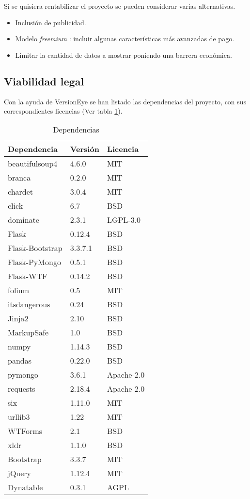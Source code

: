 Si se quisiera rentabilizar el proyecto se pueden considerar varias alternativas.

\begin{itemize}
	\item Inclusión de publicidad.
	\item Modelo \textit{freemium} \cite{wiki:freemium}: incluir algunas características más avanzadas de pago.
	\item Limitar la cantidad de datos a mostrar poniendo una barrera económica.
\end{itemize}

\subsection{Viabilidad legal}

Con la ayuda de VersionEye \cite{misc:versioneye} se han listado las dependencias del proyecto, con sus correspondientes licencias (Ver tabla \ref{tab:dependencias}). 

\begin{table}[]
	\centering
	\begin{tabular}{lll}
		\hline
		Dependencia & Versión & Licencia \\ \hline
		beautifulsoup4 & 4.6.0 & MIT \\
		branca & 0.2.0& MIT \\
		chardet & 3.0.4 & MIT \\
		click & 6.7 & BSD \\
		dominate & 2.3.1 & LGPL-3.0 \\
		Flask & 0.12.4 & BSD \\
		Flask-Bootstrap & 3.3.7.1 & BSD \\
		Flask-PyMongo & 0.5.1 & BSD \\
		Flask-WTF & 0.14.2 & BSD \\
		folium & 0.5 & MIT \\
		itsdangerous & 0.24 & BSD \\
		Jinja2 & 2.10 & BSD \\
		MarkupSafe & 1.0 & BSD \\
		numpy & 1.14.3 & BSD \\
		pandas & 0.22.0 & BSD \\
		pymongo & 3.6.1 & Apache-2.0 \\
		requests & 2.18.4 & Apache-2.0 \\
		six & 1.11.0 & MIT \\
		urllib3 & 1.22 & MIT \\
		WTForms & 2.1 & BSD \\
		xldr & 1.1.0 & BSD \\
		Bootstrap & 3.3.7 & MIT \\
		jQuery & 1.12.4 & MIT \\
		Dynatable & 0.3.1 & AGPL \\
		\bottomrule
	\end{tabular}
	\caption{Dependencias}
	\label{tab:dependencias}
\end{table}

